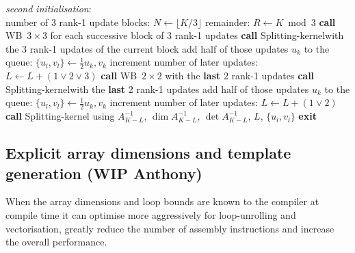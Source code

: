 \documentclass[11pt]{article}
\numberwithin{figure}{section}
\numberwithin{table}{section}
\begin{document}
      \begin{algorithm}[H]
      	\textit{second initialisation}:\\
      	number of 3 rank-1 update blocks: $N \gets \lfloor K/3\rfloor$\;
      	remainder: $R\gets K\bmod{3}$\;
      	 {
      		\textbf{call} WB~$3\times 3$ for each successive block of 3 rank-1 updates\;
      		 {
      			\textbf{call} Splitting-kernel\footnotemark[1] with the 3 rank-1 updates of the current block\;
      			 {
      				add half of those updates $u_k$ to the queue: $\{u_l,v_l\} \gets \frac{1}{2}u_k, v_k$\;
      				increment number of later updates: $L \gets L + (1 \lor 2 \lor 3)$\;
      			}
      		}
      	}
      	 {
      		\textbf{call} WB~$2\times 2$ with the \textbf{last} 2 rank-1 updates\;
      		 {
      			\textbf{call} Splitting-kernel\footnotemark[1] with the \textbf{last} 2 rank-1 updates\;
      			 {
      				add half of those updates $u_k$ to the queue: $\{u_l,v_l\} \gets \frac{1}{2}u_k, v_k$\;
      				increment number of later updates: $L \gets L + (1 \lor 2)$\;
      			}
      		}
      	}
      	{
      		\textbf{call} Splitting-kernel\footnotemark[2] using $A^{-1}_{K-L}$, $\dim A^{-1}_{K-L}$, $\det A^{-1}_{K-L} $, $L$, $\{u_l, v_l\}$\;
      	}
      	\textbf{exit}\;
      \end{algorithm}

    \subsection{Explicit array dimensions and template generation (WIP Anthony)}
      When the array dimensions and loop bounds are known to the compiler at compile time it can optimise more aggressively for loop-unrolling and vectorisation, greatly reduce the number of assembly instructions and increase the overall performance.\\
   
\end{document}
